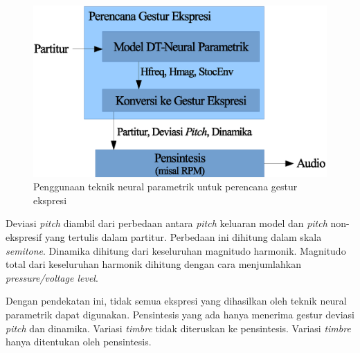 \begin{figure}[htb]
  \centering
  \includegraphics[width=\textwidth]{resources/DTNP-as-gesture-planner.eps}
  \caption{Penggunaan teknik neural parametrik untuk perencana gestur ekspresi}\label{fig-dtnp-as-gesture-planner}
\end{figure}

Deviasi \textit{pitch} diambil dari perbedaan antara \textit{pitch} keluaran model dan \textit{pitch} non-ekspresif yang tertulis dalam partitur. Perbedaan ini dihitung dalam skala \textit{semitone}. Dinamika dihitung dari keseluruhan magnitudo harmonik. Magnitudo total dari keseluruhan harmonik dihitung dengan cara menjumlahkan \textit{pressure/voltage level}.

Dengan pendekatan ini, tidak semua ekspresi yang dihasilkan oleh teknik neural parametrik dapat digunakan. Pensintesis yang ada hanya menerima gestur deviasi \textit{pitch} dan dinamika. Variasi \textit{timbre} tidak diteruskan ke pensintesis. Variasi \textit{timbre} hanya ditentukan oleh pensintesis.